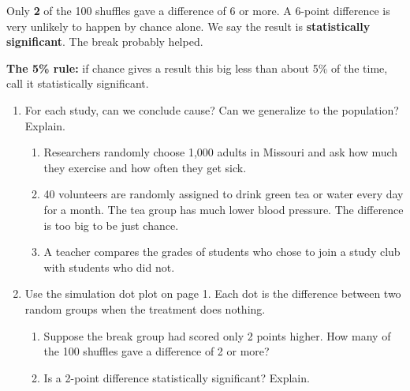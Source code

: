 \documentclass[11pt]{article}
\begin{document}
\begin{center}\end{center}

Only \textbf{2} of the 100 shuffles gave a difference of 6 or more. A 6-point difference is very unlikely to happen by chance alone.
We say the result is \textbf{statistically significant}. The break probably helped.

\vspace{0.4em}
\textbf{The 5\% rule:} if chance gives a result this big less than about 5\% of the time, call it statistically significant.

\partner

\newpage
\begin{enumerate}

\item For each study, can we conclude cause? Can we generalize to the population? Explain.
\begin{enumerate}[itemsep=3.5em]
  \item Researchers randomly choose 1,000 adults in Missouri and ask how much they exercise and how often they get sick.

  \item 40 volunteers are randomly assigned to drink green tea or water every day for a month. The tea group has much lower blood pressure. The difference is too big to be just chance.

  \item A teacher compares the grades of students who chose to join a study club with students who did not.

\end{enumerate}
\work{2em}

\item Use the simulation dot plot on page 1. Each dot is the difference between two random groups when the treatment does nothing.
\begin{enumerate}[itemsep=1em]
  \item Suppose the break group had scored only 2 points higher. How many of the 100 shuffles gave a difference of 2 or more?

  \work{2em}
  \item Is a 2-point difference statistically significant? Explain.


\end{enumerate}
\end{enumerate}
\end{document}
